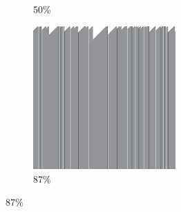 \documentclass[12pt, fleqn]{report}                             %
\theoremstyle{break}                                            %
\begin{document}
\begin{figure}[ht!]
\begin{subfigure}[b]{0.4\linewidth}
          \caption{50\%}
        \end{subfigure}
        \begin{subfigure}[b]{0.4\linewidth}
          \includegraphics[width=0.6\textwidth]{Images/156/d.png}
          \caption{87\%}
        \end{subfigure}
      \end{figure}
\end{document}
